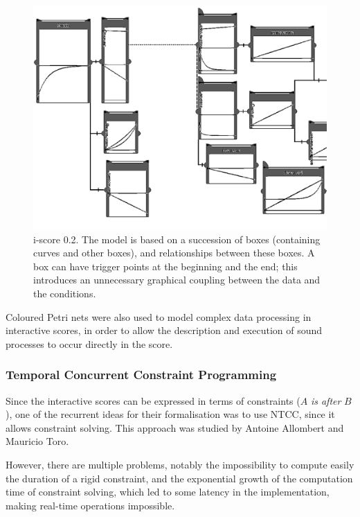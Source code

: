 \documentclass{article}
\begin{document}
    \begin{figure}[h]
    \centering
    \includegraphics[width=0.9\columnwidth]{iscore-2}
    \caption{i-score 0.2. The model is based on a succession of boxes (containing curves and other boxes), and relationships between these boxes. A box can have trigger points at the beginning and the end; this introduces an unnecessary graphical coupling between the data and the conditions.}
    \label{fig.iscore02}
    \end{figure}
	
	Coloured Petri nets were also used to model complex data processing in interactive scores\cite{arias2014modelling}, in order to allow the description and execution of sound processes to occur directly in the score.
	
	\subsubsection{Temporal Concurrent Constraint Programming} 
	Since the interactive scores can be expressed in terms of constraints ($A$ \emph{is after} $B$), one of the recurrent ideas for their formalisation was to use \ac{NTCC}, since it allows constraint solving. This approach was studied by Antoine Allombert\cite{allombert2006concurrent} and Mauricio Toro\cite{toro2010concurrent, mauricio2012structured}. 
	
	However, there are multiple problems, notably the impossibility to compute easily the duration of a rigid constraint, and the exponential growth of the computation time of constraint solving, which led to some latency in the implementation, making real-time operations impossible.
	
\end{document}
